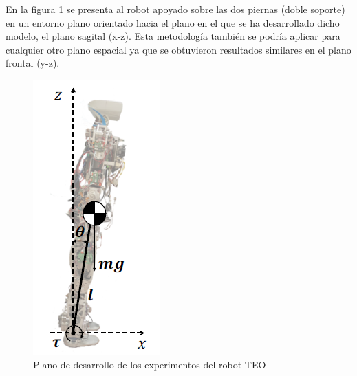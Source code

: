 En la figura \ref{figura53} se presenta al robot apoyado sobre las dos piernas (doble soporte) en un entorno plano orientado hacia el plano en el que se ha desarrollado dicho modelo, el plano sagital (x-z). Esta metodología también se podría aplicar para cualquier otro plano espacial ya que se obtuvieron resultados similares en el plano frontal (y-z). 

\begin{figure}[H]
\centering
\includegraphics[scale=0.65]{imagenes/apartado_5/53_postura_inicial_experimental_teo}
\caption{Plano de desarrollo de los experimentos del robot TEO}
\label{figura53}
\end{figure}

